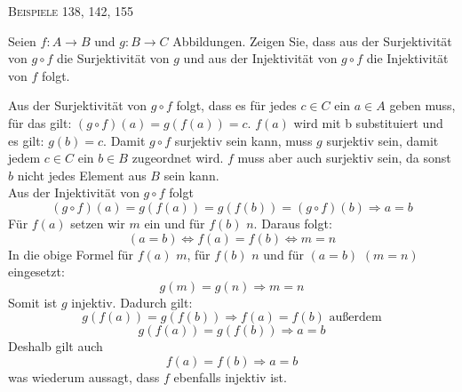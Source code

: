 \documentclass[a4paper, 12pt, margins=3cm]{homework}
\begin{document}
  \begin{center}
    \textsc{Beispiele 138, 142, 155}
  \end{center}

  \begin{problem}
    Seien $f:A\rightarrow B$ und $g:B\rightarrow C$ Abbildungen. Zeigen Sie, dass
    aus der Surjektivität von $g\circ f$ die Surjektivität von $g$ und aus der
    Injektivität von $g\circ f$ die Injektivität von $f$ folgt.
  \end{problem}
  \begin{solution}
    Aus der Surjektivität von $g\circ f$ folgt, dass es für jedes $c\in C$ ein 
    $a\in A$ geben muss, für das gilt: $(g\circ f)(a) = g(f(a)) = c$. $f(a)$ wird
    mit b substituiert und es gilt: $g(b) = c$. Damit $g\circ f$ surjektiv sein
    kann, muss $g$ surjektiv sein, damit jedem $c\in C$ ein $b\in B$ zugeordnet
    wird. $f$ muss aber auch surjektiv sein, da sonst $b$ nicht jedes Element
    aus $B$ sein kann. \\

    Aus der Injektivität von $g\circ f$ folgt
    \[ (g\circ f)(a) = g(f(a)) = g(f(b)) = (g\circ f)(b)\Rightarrow a = b \]
    Für $f(a)$ setzen wir $m$ ein und für $f(b)$ $n$. Daraus folgt:
    \[ (a = b) \Longleftrightarrow f(a) = f(b) \Longleftrightarrow m = n \]
    In die obige Formel für $f(a)$ $m$, für $f(b)$ $n$ und für $(a = b)$ $(m = n)$
    eingesetzt:
    \[ g(m) = g(n) \Rightarrow m = n \] 
    Somit ist $g$ injektiv. Dadurch gilt:
    \[ g(f(a)) = g(f(b)) \Rightarrow f(a) = f(b) \text{ außerdem}\]
    \[ g(f(a)) = g(f(b)) \Rightarrow a = b \]
    Deshalb gilt auch
    \[f(a) = f(b) \Rightarrow a = b\]
    was wiederum aussagt, dass $f$ ebenfalls injektiv ist.
  \end{solution}
\end{document}
